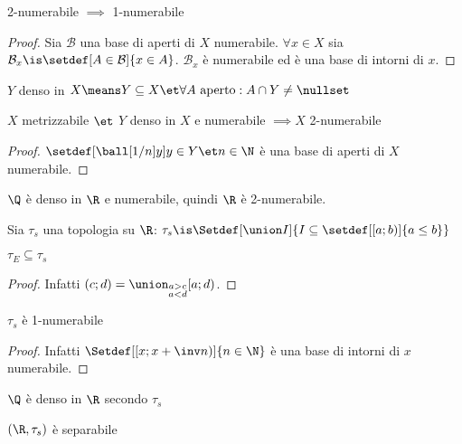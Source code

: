 
\begin{lemma}
2-numerabile $\implies$ 1-numerabile
\end{lemma}
\begin{proof}
Sia $\mathcal B$ una base di aperti di $X$ numerabile. $\forall x\in X$ sia $\mathcal B_x\is\setdef[A\in\mathcal B]{x\in A}$. $\mathcal B_x$ è numerabile ed è una base di intorni di $x$.
\end{proof}

\begin{defn}[Densità]
$Y$ denso in $X\means Y\subseteq X\et\forall A\text{ aperto}:A\cap Y\neq\nullset$
\end{defn}

\begin{lemma}
$X$ metrizzabile $\et$ $Y$ denso in $X$ e numerabile $\implies X$ 2-numerabile
\end{lemma}
\begin{proof}
$\setdef[{\ball[1/n]y}]{y\in Y\et n\in\N}$ è una base di aperti di $X$ numerabile.
\end{proof}

\begin{es}
$\Q$ è denso in $\R$ e numerabile, quindi $\R$ è 2-numerabile.
\end{es}

\begin{defn}
Sia $\tau_s$ una topologia su $\R$: $\tau_s\is\Setdef[\union I]{I\subseteq\setdef[[a;b)]{a\leq b}}$
\end{defn}

\begin{prop}
$\tau_E\subseteq\tau_s$
\end{prop}
\begin{proof}
Infatti $(c;d)=\union_{\substack{a>c\\a<d}}[a;d)$.
\end{proof}

\begin{prop}
$\tau_s$ è 1-numerabile
\end{prop}
\begin{proof}
Infatti $\Setdef[\left[x;x+\inv n\right)]{n\in\N}$ è una base di intorni di $x$ numerabile.
\end{proof}

\begin{prop}
$\Q$ è denso in $\R$ secondo $\tau_s$
\end{prop}

\begin{prop}
$(\R,\tau_s)$ è separabile
\end{prop}

